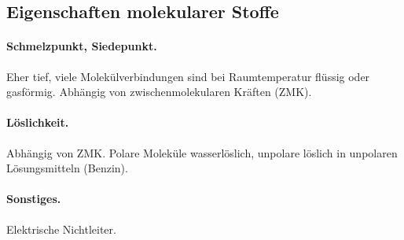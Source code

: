 \subsection{Eigenschaften molekularer Stoffe}

\paragraph{Schmelzpunkt, Siedepunkt.}

Eher tief, viele Molekülverbindungen sind bei Raumtemperatur flüssig oder gasförmig. Abhängig von zwischenmolekularen Kräften (ZMK).

\paragraph{Löslichkeit.}

Abhängig von ZMK. Polare Moleküle wasserlöslich, unpolare löslich in unpolaren Lösungsmitteln (Benzin).

\paragraph{Sonstiges.}

Elektrische Nichtleiter.


